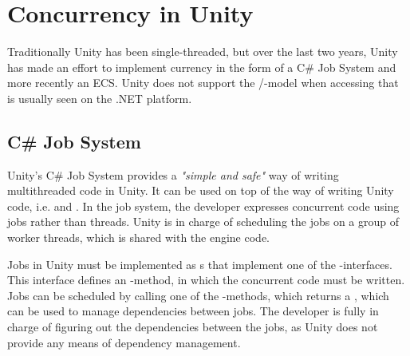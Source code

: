 \section{Concurrency in Unity} \label{sec:unity:concurrency}
Traditionally Unity has been single-threaded, but over the last two years, Unity has made an effort to implement currency in the form of a C\# Job System\cite{unity:csharp:job:system} and more recently an \gls{ECS}\cite{unity:ecs}. Unity does not support the /-model when accessing  that is usually seen on the .NET platform\cite{unity:async,csharp:async}.

\subsection{C\# Job System}
Unity's C\# Job System provides a \textit{"simple and safe"} way of writing multithreaded code in Unity. It can be used on top of the  way of writing Unity code, i.e.  and . In the job system, the developer expresses concurrent code using jobs rather than threads. Unity is in charge of scheduling the jobs on a group of worker threads, which is shared with the engine code\cite{unity:csharp:job:system}.

Jobs in Unity must be implemented as s that implement one of the -interfaces. This interface defines an -method, in which the concurrent code must be written. Jobs can be scheduled by calling one of the -methods, which returns a , which can be used to manage dependencies between jobs. The developer is fully in charge of figuring out the dependencies between the jobs, as Unity does not provide any means of dependency management\cite{unity:csharp:job:system}.

